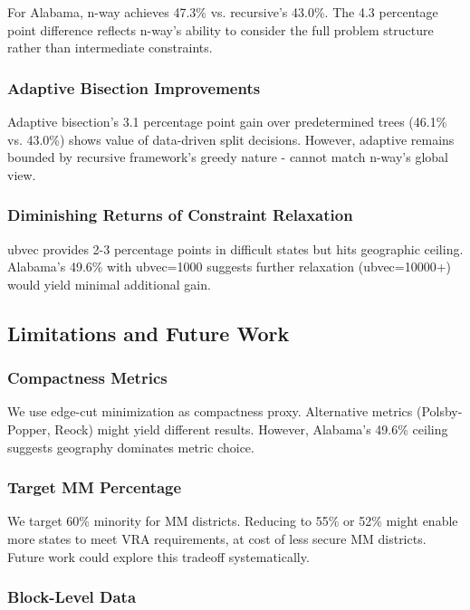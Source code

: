 For Alabama, n-way achieves 47.3\% vs. recursive's 43.0\%. The 4.3 percentage point difference reflects n-way's ability to consider the full problem structure rather than intermediate constraints.

\subsubsection{Adaptive Bisection Improvements}

Adaptive bisection's 3.1 percentage point gain over predetermined trees (46.1\% vs. 43.0\%) shows value of data-driven split decisions. However, adaptive remains bounded by recursive framework's greedy nature - cannot match n-way's global view.

\subsubsection{Diminishing Returns of Constraint Relaxation}

ubvec provides 2-3 percentage points in difficult states but hits geographic ceiling. Alabama's 49.6\% with ubvec=1000 suggests further relaxation (ubvec=10000+) would yield minimal additional gain.

\subsection{Limitations and Future Work}

\subsubsection{Compactness Metrics}

We use edge-cut minimization as compactness proxy. Alternative metrics (Polsby-Popper, Reock) might yield different results. However, Alabama's 49.6\% ceiling suggests geography dominates metric choice.

\subsubsection{Target MM Percentage}

We target 60\% minority for MM districts. Reducing to 55\% or 52\% might enable more states to meet VRA requirements, at cost of less secure MM districts. Future work could explore this tradeoff systematically.

\subsubsection{Block-Level Data}

